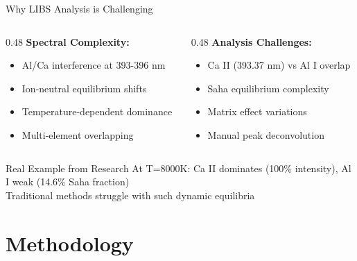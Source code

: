 \documentclass{beamer}
\begin{document}
\begin{frame}{Why LIBS Analysis is Challenging}
  \begin{columns}[T]
    \begin{column}{0.48\textwidth}
      \textbf{Spectral Complexity:}
      \begin{itemize}
        \item Al/Ca interference at 393-396 nm
        \item Ion-neutral equilibrium shifts
        \item Temperature-dependent dominance
        \item Multi-element overlapping
      \end{itemize}
    \end{column}
    \begin{column}{0.48\textwidth}
      \textbf{Analysis Challenges:}
      \begin{itemize}
        \item Ca II (393.37 nm) vs Al I overlap
        \item Saha equilibrium complexity
        \item Matrix effect variations
        \item Manual peak deconvolution
      \end{itemize}
    \end{column}
  \end{columns}
  
  \vspace{1em}
  \begin{alertblock}{Real Example from Research}
    At T=8000K: Ca II dominates (100\% intensity), Al I weak (14.6\% Saha fraction)\\
    Traditional methods struggle with such dynamic equilibria
  \end{alertblock}
\end{frame}

\section{Methodology}
\end{document}
